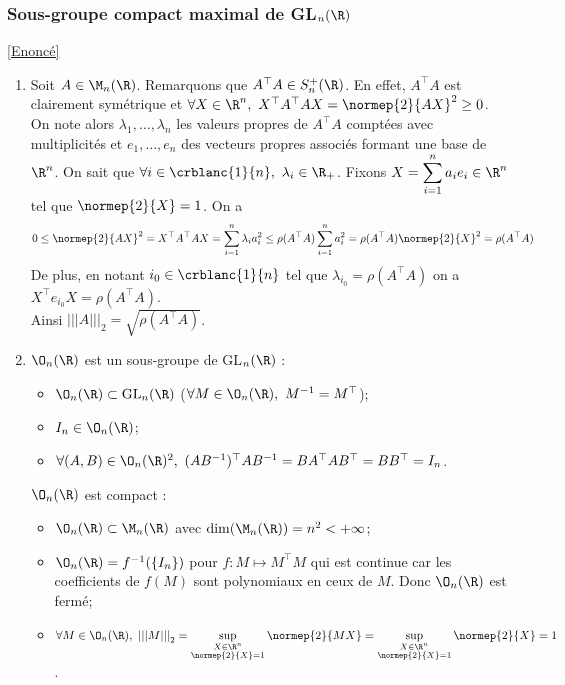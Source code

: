 \documentclass[8pt]{book}
\begin{document}
	\subsubsection{Sous-groupe compact maximal de GL$_n(\R)$ }
	\label{Sous-groupe compact maximal de GLn(R) corrigé}
	\textcolor{blue}{\hyperref[Sous-groupe compact maximal de GLn(R)]{[Enoncé]}}\\
	\begin{enumerate}[leftmargin=*]
		\item Soit $A\in \M_n(\R)$. Remarquons que $A^\top A\in S_n^+(\R)$. En effet, $A^\top A$ est clairement symétrique et $\forall X\in \R^n,\ X^\top A^\top AX=\normep{2}{AX}^2\geq 0$. On note alors $\lambda_1,\dots,\lambda_n$ les valeurs propres de $A^\top A$ comptées avec multiplicités et $e_1,\dots,e_n$ des vecteurs propres associés formant une base de $\R^n$. On sait que $\forall i\in \crblanc{1}{n},\ \lambda_i\in \R_+$. Fixons $X=\displaystyle\sum_{i=1}^na_ie_i\in \R^n$ tel que $\normep{2}{X}=1$. On a\\
		$$0\leq \normep{2}{AX}^2=X^\top A^\top AX=\sum_{i=1}^n\lambda_ia_i^2\leq \rho(A^\top A)\sum_{i=1}^na_i^2=\rho(A^\top A)\normep{2}{X}^2=\rho(A^\top A)$$
		De plus, en notant $i_0\in \crblanc{1}{n}$ tel que $\lambda_{i_0}=\rho(A^\top A)$ on a $X^\top e_{i_0}X=\rho(A^\top A)$.\\
		Ainsi ${|||A|||}_2=\sqrt{\rho(A^\top A)}$.
		\item $\O_n(\R)$ est un sous-groupe de GL$_n(\R)$ :
		\begin{itemize}
			\item $\O_n(\R)\subset \text{GL}_n(\R)$ ($\forall M\in \O_n(\R),\ M^{-1}=M^\top$);
			\item $I_n\in \O_n(\R)$;
			\item $\forall (A,B)\in \O_n(\R)^2,\ (AB^{-1})^\top AB^{-1}=BA^\top AB^\top=BB^\top=I_n$.
		\end{itemize}
		$\O_n(\R)$ est compact :
		\begin{itemize}
			\item $\O_n(\R)\subset \M_n(\R)$ avec $\dim(\M_n(\R))=n^2<+\infty$;
			\item $\O_n(\R)=f^{-1}(\{I_n\})$ pour $f:M\mapsto M^\top M$ qui est continue car les coefficients de $f(M)$ sont polynomiaux en ceux de $M$. Donc $\O_n(\R)$ est fermé;
			\item $\forall M\in \O_n(\R),\ {|||M|||}_2=\sup\limits_{\substack{X\in \R^n\\\normep{2}{X}=1}}\normep{2}{MX}=\sup\limits_{\substack{X\in \R^n\\\normep{2}{X}=1}}\normep{2}{X}=1$.

\end{itemize}
\end{enumerate}
\end{document}
